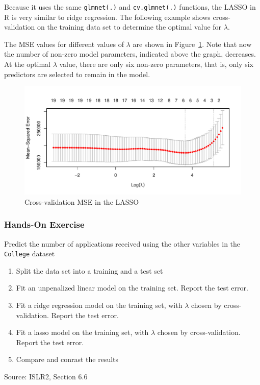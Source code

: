 Because it uses the same \texttt{glmnet(.)} and \texttt{cv.glmnet(.)} functions, the LASSO in R is very similar to ridge regression. The following example shows cross-validation on the training data set to determine the optimal value for $\lambda$. 

\begin{samepage}
\end{samepage}

The MSE values for different values of $\lambda$ are shown in Figure~\ref{fig:lassocv}. Note that now the number of non-zero model parameters, indicated above the graph, decreases. At the optimal $\lambda$ value, there are only six non-zero parameters, that is, only six predictors are selected to remain in the model.

\begin{figure}
\centering
\includegraphics[width=.9\textwidth]{crossvalidated_lasso.pdf}

\caption{Cross-validation MSE in the LASSO}
\label{fig:lassocv}
\end{figure}

\begin{tcolorbox}[colback=code]
\subsubsection*{Hands-On Exercise} 

Predict the number of applications received using the other variables in the \texttt{College} dataset
  \begin{enumerate} 
      \item Split the data set into a training and a test set
      \item Fit an unpenalized linear model on the training set. Report the test error.
      \item Fit a ridge regression model on the training set, with $\lambda$ chosen by cross-validation. Report the test error.
      \item Fit a lasso model on the training set, with $\lambda$ chosen by cross-validation. Report the test error.
      \item Compare and conrast the results
  \end{enumerate}

\footnotesize Source: ISLR2, Section 6.6 \normalsize
\end{tcolorbox}


